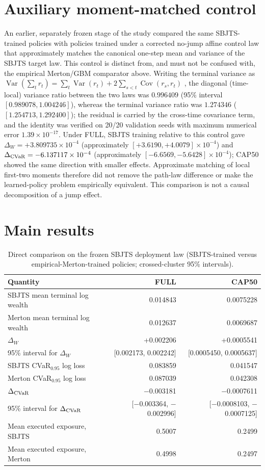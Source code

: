 \documentclass[11pt]{article}
\newcommand{\Cov}{\operatorname{Cov}}
\begin{document}
\section{Auxiliary moment-matched control}\label{sec:base4}
An earlier, separately frozen stage of the study compared the same SBJTS-trained policies with policies trained under a corrected no-jump affine control law that approximately matches the canonical one-step mean and variance of the SBJTS target law. This control is distinct from, and must not be confused with, the empirical Merton/GBM comparator above. Writing the terminal variance as $\operatorname{Var}(\sum_t r_t)=\sum_t\operatorname{Var}(r_t)+2\sum_{s<t}\Cov(r_s,r_t)$ \cite{LoMacKinlay1988}, the diagonal (time-local) variance ratio between the two laws was $0.996409$ (95\% interval $[0.989078,1.004246]$), whereas the terminal variance ratio was $1.274346$ ($[1.254713,1.292400]$); the residual is carried by the cross-time covariance term, and the identity was verified on 20/20 validation seeds with maximum numerical error $1.39\times10^{-17}$. Under FULL, SBJTS training relative to this control gave $\Delta_W=+3.809735\times10^{-4}$ (approximately $[+3.6190,+4.0079]\times10^{-4}$) and $\Delta_{\rm CVaR}=-6.137117\times10^{-4}$ (approximately $[-6.6569,-5.6428]\times10^{-4}$); CAP50 showed the same direction with smaller effects. Approximate matching of local first-two moments therefore did not remove the path-law difference or make the learned-policy problem empirically equivalent. This comparison is not a causal decomposition of a jump effect.

\section{Main results}
\begin{table}[htbp]
\centering
\caption{Direct comparison on the frozen SBJTS deployment law (SBJTS-trained versus empirical-Merton-trained policies; crossed-cluster 95\% intervals).}
\begin{tabular}{@{}lrr@{}}
\toprule
Quantity & FULL & CAP50\\
\midrule
SBJTS mean terminal log wealth & 0.014843 & 0.0075228\\
Merton mean terminal log wealth & 0.012637 & 0.0069687\\
$\Delta_W$ & +0.002206 & +0.0005541\\
95\% interval for $\Delta_W$ & [0.002173, 0.002242] & [0.0005450, 0.0005637]\\
SBJTS CVaR$_{0.95}$ log loss & 0.083859 & 0.041547\\
Merton CVaR$_{0.95}$ log loss & 0.087039 & 0.042308\\
$\Delta_{\rm CVaR}$ & $-$0.003181 & $-$0.0007611\\
95\% interval for $\Delta_{\rm CVaR}$ & [$-$0.003364, $-$0.002996] & [$-$0.0008103, $-$0.0007125]\\
Mean executed exposure, SBJTS & 0.5007 & 0.2499\\
Mean executed exposure, Merton & 0.4998 & 0.2497\\
\bottomrule
\end{tabular}
\end{table}
\end{document}
